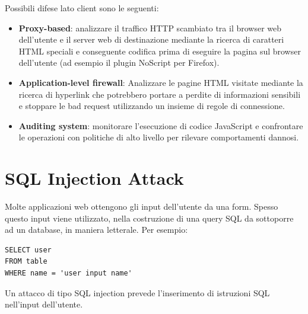Possibili difese lato client sono le seguenti:
\begin{itemize}
	\item \textbf{Proxy-based}: analizzare il traffico HTTP scambiato tra il browser web dell'utente e il server web di destinazione mediante la ricerca di caratteri HTML speciali e conseguente codifica prima di eseguire la pagina sul browser dell'utente (ad esempio il plugin NoScript per Firefox).
	\item \textbf{Application-level firewall}: Analizzare le pagine HTML visitate mediante la ricerca di hyperlink che potrebbero portare a perdite di informazioni sensibili e stoppare le bad request utilizzando un insieme di regole di connessione.
	\item \textbf{Auditing system}: monitorare l'esecuzione di codice JavaScript e confrontare le operazioni con politiche di alto livello per rilevare comportamenti dannosi.
\end{itemize}

\section{SQL Injection Attack}
Molte applicazioni web ottengono gli input dell'utente da una form. Spesso questo input viene utilizzato, nella costruzione di una query SQL da sottoporre ad un database, in maniera letterale. Per esempio:
\begin{lstlisting}
SELECT user 
FROM table
WHERE name = 'user input name'
\end{lstlisting}
Un attacco di tipo SQL injection prevede l'inserimento di istruzioni SQL nell'input dell'utente.
